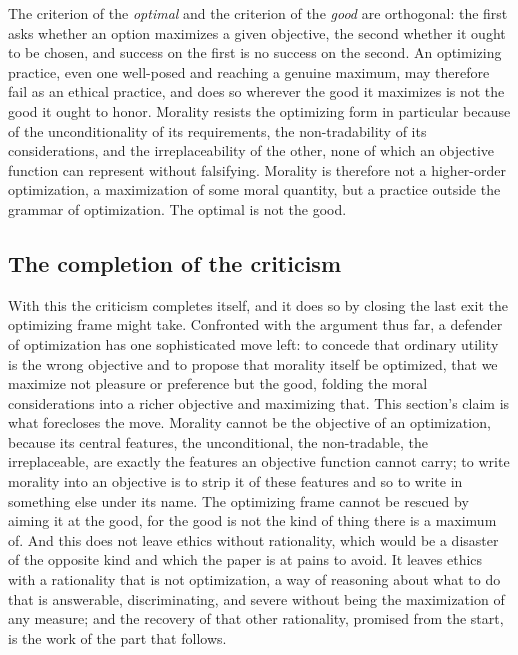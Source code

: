 \begin{claim}
The criterion of the \emph{optimal} and the criterion of the \emph{good} are orthogonal: the first asks whether an option maximizes a given objective, the second whether it ought to be chosen, and success on the first is no success on the second. An optimizing practice, even one well-posed and reaching a genuine maximum, may therefore fail as an ethical practice, and does so wherever the good it maximizes is not the good it ought to honor. Morality resists the optimizing form in particular because of the unconditionality of its requirements, the non-tradability of its considerations, and the irreplaceability of the other, none of which an objective function can represent without falsifying. Morality is therefore not a higher-order optimization, a maximization of some moral quantity, but a practice outside the grammar of optimization. The optimal is not the good.
\end{claim}

\subsection*{The completion of the criticism}

With this the criticism completes itself, and it does so by closing the last exit the optimizing frame might take. Confronted with the argument thus far, a defender of optimization has one sophisticated move left: to concede that ordinary utility is the wrong objective and to propose that morality itself be optimized, that we maximize not pleasure or preference but the good, folding the moral considerations into a richer objective and maximizing that. This section's claim is what forecloses the move. Morality cannot be the objective of an optimization, because its central features, the unconditional, the non-tradable, the irreplaceable, are exactly the features an objective function cannot carry; to write morality into an objective is to strip it of these features and so to write in something else under its name. The optimizing frame cannot be rescued by aiming it at the good, for the good is not the kind of thing there is a maximum of. And this does not leave ethics without rationality, which would be a disaster of the opposite kind and which the paper is at pains to avoid. It leaves ethics with a rationality that is not optimization, a way of reasoning about what to do that is answerable, discriminating, and severe without being the maximization of any measure; and the recovery of that other rationality, promised from the start, is the work of the part that follows.

